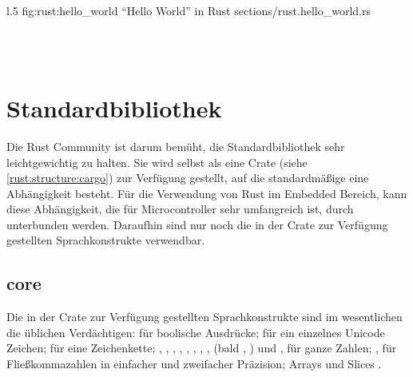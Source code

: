 \begin{wrapfigure}{l}{.5\textwidth}
	\rustcinclude
		{fig:rust:hello_world}
		{\enquote{Hello World} in Rust}
		{sections/rust.hello_world.rs}
\end{wrapfigure}





 \\

 \\
\cite{rust:orly_programming}



\clearpage

\section{Standardbibliothek}

Die Rust Community ist darum bemüht, die Standardbibliothek sehr leichtgewichtig zu halten.
Sie wird selbst als eine Crate (siehe \autoref{rust:structure:cargo}) zur Verfügung gestellt, auf die standardmäßige eine Abhängigkeit besteht.
Für die Verwendung von Rust im Embedded Bereich, kann diese Abhängigkeit, die für Microcontroller sehr umfangreich ist, durch \rustcinline{#![no_std]} unterbunden werden.
Daraufhin sind nur noch die in der  Crate zur Verfügung gestellten Sprachkonstrukte verwendbar.

\subsection{core}
\label{rust:core}
Die in der  Crate zur Verfügung gestellten Sprachkonstrukte sind im wesentlichen die üblichen  Verdächtigen:  für boolische Ausdrücke;  für ein einzelnes Unicode Zeichen;  für eine Zeichenkette; , , , , , , , , (bald ,  ) und ,   für ganze Zahlen; ,  für Fließkommazahlen in einfacher und zweifacher Präzision; Arrays und Slices \cite{rust:book:primitives}.

